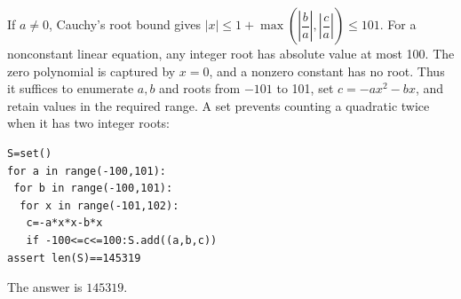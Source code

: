 If $ a\ne0 $, Cauchy's root bound gives $|x|\le1+\max(|\dfrac{b}{a}|,|\dfrac{c}{a}|)\le101 $. For a nonconstant linear equation, any integer root has absolute value at most 100. The zero polynomial is captured by $ x=0 $, and a nonzero constant has no root. Thus it suffices to enumerate $ a,b $ and roots from $-101 $ to 101, set $ c=-ax^2-bx $, and retain values in the required range. A set prevents counting a quadratic twice when it has two integer roots:
\begin{verbatim}
S=set()
for a in range(-100,101):
 for b in range(-100,101):
  for x in range(-101,102):
   c=-a*x*x-b*x
   if -100<=c<=100:S.add((a,b,c))
assert len(S)==145319
\end{verbatim}
The answer is $\boxed{145319}$.

